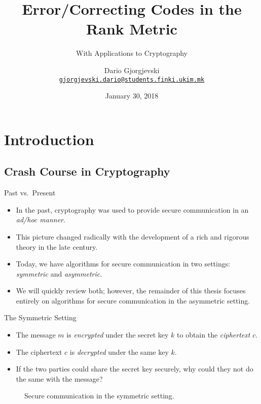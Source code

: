 \documentclass[usepdftitle=false]{beamer}
\title{Error\-/Correcting Codes in the Rank Metric}
\subtitle{With Applications to Cryptography}
\author[Dario Gj.]{%
  Dario Gjorgjevski\inst{1}\\%
  \href{mailto:gjorgjevski.dario@students.finki.ukim.mk}%
  {\nolinkurl{gjorgjevski.dario@students.finki.ukim.mk}}
}
\institute[FCSE]{%
  \inst{1}Faculty of Computer Science and Engineering\\%
  Ss.\ Cyril and Methodius University in Skopje
}
\date{January 30, 2018}
\newcommand*{\enc}{\ensuremath{\mathsf{Enc}}}
\newcommand*{\dec}{\ensuremath{\mathsf{Dec}}}
\begin{document}
\begin{frame}
  \titlepage
\end{frame}

\section{Introduction}

\subsection{Crash Course in Cryptography}

\begin{frame}{Past vs.\ Present}
  \begin{itemize}
  \item In the past, cryptography was used to provide secure
    communication in an \emph{ad\-/hoc manner}.
  \item This picture changed radically with the development of a rich
    and rigorous theory in the late  century.
  \item Today, we have algorithms for secure communication in two
    settings: \emph{\alert{symmetric}} and \emph{\alert{asymmetric}}.
  \item We will quickly review both; however, the remainder of this
    thesis focuses entirely on algorithms for secure communication in
    the asymmetric setting.
  \end{itemize}
\end{frame}

\begin{frame}{The Symmetric Setting}
  \begin{itemize}
  \item The message \(m\) is \emph{encrypted} under the secret key
    \(k\) to obtain the \emph{ciphertext} \(c\).
  \item The ciphertext \(c\) is \emph{decrypted} under \alert{the same
      key} \(k\).
  \item If the two parties could share the secret key securely, why
    could they not do the same with the message?
  \end{itemize}
  \begin{figure}
    \centering
    \caption{Secure communication in the symmetric setting.}
  \end{figure}
\end{frame}
\end{document}
